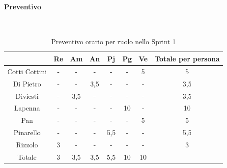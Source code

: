 \documentclass{article}
\begin{document}
                \paragraph{Preventivo}\mbox{}\\
                \begin{table}[H]
                    \centering
                    \begin{tabular}{|c|c|c|c|c|c|c|c|}
                    \hline
                                  & Re  & Am  & An  & Pj  & Pg  & Ve  & Totale per persona \\ \hline
                    Cotti Cottini & -   & -   & -   & -   & -   & 5   & 5                  \\ \hline
                    Di Pietro     & -   & -   & 3,5 & -   & -   & -   & 3,5                \\ \hline
                    Diviesti      & -   & 3,5 & -   & -   & -   & -   & 3,5                \\ \hline
                    Lapenna       & -   & -   & -   & -   & 10  & -   & 10                 \\ \hline
                    Pan           & -   & -   & -   & -   & -   & 5   & 5                  \\ \hline
                    Pinarello     & -   & -   & -   & 5,5 & -   & -   & 5,5                \\ \hline
                    Rizzolo       & 3   & -   & -   & -   & -   & -   & 3                  \\ \hline
                    Totale        & 3   & 3,5 & 3,5 & 5,5 & 10  & 10  &                    \\ \hline
                    \end{tabular}
                    \caption{Preventivo orario per ruolo nello Sprint 1}
                \end{table}

\end{document}
